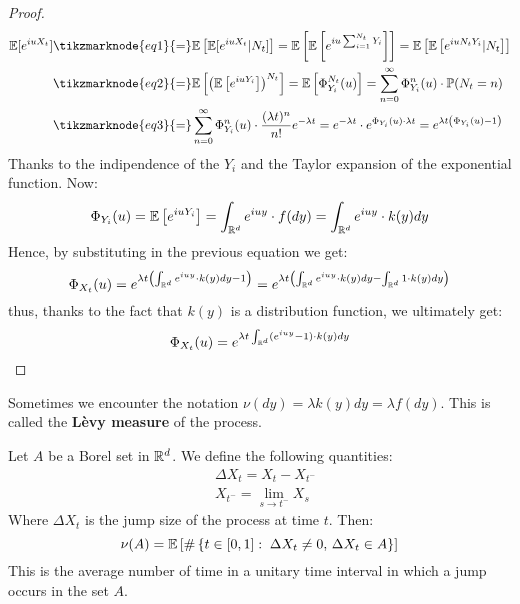 \begin{proof}
    \begin{align*}
        \E[e^{iuX_t}] & \tikzmarknode{eq1}{=} \E\left[ \E[e^{iuX_t} | N_t]
            \right] = \E\left[ \E\left[ e^{iu\sum_{i=1}^{N_t} Y_i} \right]
            \right] = \E\left[ \E\left[ e^{iuN_tY_i} | N_t \right] \right]\\
        & \tikzmarknode{eq2}{=} \E\left[ \left(\E\left[ e^{iuY_i} \right]
            \right)^{N_t} \right] = \E\left[ \Phi^{N_t}_{Y_i}(u) \right] =
            \sum_{n=0}^\infty \Phi^n_{Y_i}(u) \cdot \P(N_t = n) \\
        & \tikzmarknode{eq3}{=} \sum_{n=0}^\infty \Phi^n_{Y_i}(u) \cdot
            \frac{(\lambda t)^n}{n!} e^{-\lambda t} = e^{-\lambda t}\cdot e^{
            \Phi_{Y_i}(u) \cdot \lambda t} = e^{\lambda t \left( \Phi_{Y_i}(u)
            - 1 \right)}
    \end{align*} 
    Thanks to the indipendence of the $Y_i$ and the Taylor expansion of the
    exponential function. Now:
    \[
        \Phi_{Y_i}(u) = \mathbb{E}\left[ e^{iuY_i} \right] = \int_{\mathbb{R}^d} e^{iuy} \cdot
        f(dy) = \int_{\mathbb{R}^d} e^{iuy} \cdot k(y)dy
    \]
    Hence, by substituting in the previous equation we get:
    \[
        \Phi_{X_t}(u) = e^{\lambda t \left( \int_{\mathbb{R}^d} e^{iuy} \cdot k(y)dy -
        1 \right)} = e^{\lambda t \left( \int_{\mathbb{R}^d} e^{iuy} \cdot k(y)dy - 
        \int_{\mathbb{R}^d} 1 \cdot k(y)dy \right)}
    \]
    thus, thanks to the fact that $k(y)$ is a distribution function, we
    ultimately get:
    \[
        \Phi_{X_t}(u) = e^{\lambda t \int_{\mathbb{R}^d} (e^{iuy} - 1) \cdot k(y)dy}
    \]
\end{proof}

Sometimes we encounter the notation $\nu(dy) = \lambda k(y)dy = \lambda f(dy)$.
This is called the \textbf{Lèvy measure} of the process.

\begin{definition}
    Let $A$ be a Borel set in $\mathbb{R}^d$. We define the following quantities:
    \begin{align*}
        & \Delta X_t = X_t - X_{t^-} \\
        & X_{t^-} = \lim_{s \to t^-} X_s
    \end{align*}
    Where $\Delta X_t$ is the jump size of the process at time $t$. Then:
    \[
        \nu(A) = \mathbb{E}\left[ \#\left\{ t\in[0,1] :\; \Delta X_t \neq 0, \,
        \Delta X_t \in A \right\} \right]
    \]
    This is the average number of time in a unitary time interval in which a
    jump occurs in the set $A$.
\end{definition}

